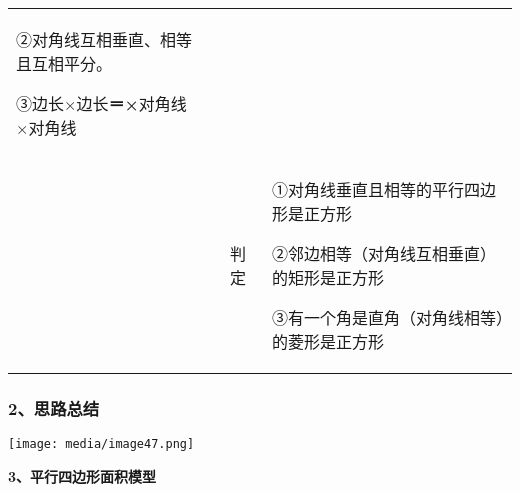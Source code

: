 \documentclass[a4paper,11pt,UTF8]{ctexart}
\begin{document}
\begin{longtable}[]{@{}llll@{}}
\begin{minipage}[t]{0.22\columnwidth}
②对角线互相垂直、相等且互相平分。

③边长×边长\textbf{＝×}对角线×对角线\strut
\end{minipage}\tabularnewline
\begin{minipage}[t]{0.22\columnwidth}\raggedright
\strut
\end{minipage} & \begin{minipage}[t]{0.22\columnwidth}\raggedright
\strut
\end{minipage} & \begin{minipage}[t]{0.22\columnwidth}\raggedright
判定\strut
\end{minipage} & \begin{minipage}[t]{0.22\columnwidth}\raggedright
①对角线垂直且相等的平行四边形是正方形

②邻边相等（对角线互相垂直）的矩形是正方形

③有一个角是直角（对角线相等）的菱形是正方形\strut
\end{minipage}\tabularnewline
\bottomrule
\end{longtable}

\hypertarget{ux601dux8defux603bux7ed3}{%
\subsubsection{\texorpdfstring{\textbf{2、思路总结}}{2、思路总结}}\label{ux601dux8defux603bux7ed3}}

\texttt{[image: media/image47.png]}

\textbf{3、平行四边形面积模型}
\end{document}
